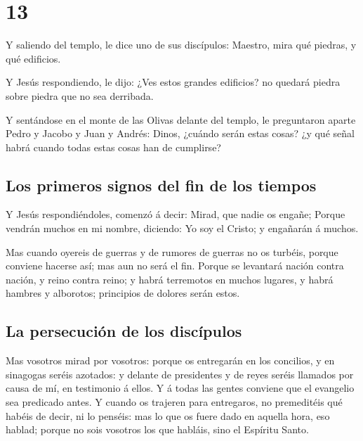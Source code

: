 \hypertarget{section-41-13}{%
\section{13}\label{section-41-13}}

 Y saliendo del templo, le dice uno de sus discípulos:
Maestro, mira qué piedras, y qué edificios.

 Y Jesús respondiendo, le dijo: ¿Ves estos grandes
edificios? no quedará piedra sobre piedra que no sea derribada.

 Y sentándose en el monte de las Olivas delante del
templo, le preguntaron aparte Pedro y Jacobo y Juan y Andrés:
 Dinos, ¿cuándo serán estas cosas? ¿y qué señal habrá
cuando todas estas cosas han de cumplirse?

\hypertarget{los-primeros-signos-del-fin-de-los-tiempos-1}{%
\subsection{Los primeros signos del fin de los
tiempos}\label{los-primeros-signos-del-fin-de-los-tiempos-1}}

 Y Jesús respondiéndoles, comenzó á decir: Mirad, que
nadie os engañe;  Porque vendrán muchos en mi nombre,
diciendo: Yo soy el Cristo; y engañarán á muchos.

 Mas cuando oyereis de guerras y de rumores de guerras no
os turbéis, porque conviene hacerse así; mas aun no será el fin.
 Porque se levantará nación contra nación, y reino contra
reino; y habrá terremotos en muchos lugares, y habrá hambres y
alborotos; principios de dolores serán estos.

\hypertarget{la-persecuciuxf3n-de-los-discuxedpulos}{%
\subsection{La persecución de los
discípulos}\label{la-persecuciuxf3n-de-los-discuxedpulos}}

 Mas vosotros mirad por vosotros: porque os entregarán en
los concilios, y en sinagogas seréis azotados: y delante de presidentes
y de reyes seréis llamados por causa de mí, en testimonio á ellos.
 Y á todas las gentes conviene que el evangelio sea
predicado antes.  Y cuando os trajeren para entregaros,
no premeditéis qué habéis de decir, ni lo penséis: mas lo que os fuere
dado en aquella hora, eso hablad; porque no sois vosotros los que
habláis, sino el Espíritu Santo.

